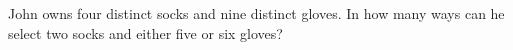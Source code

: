 John owns four distinct socks and nine distinct gloves. In how many ways can he select two socks and either five or six gloves?
